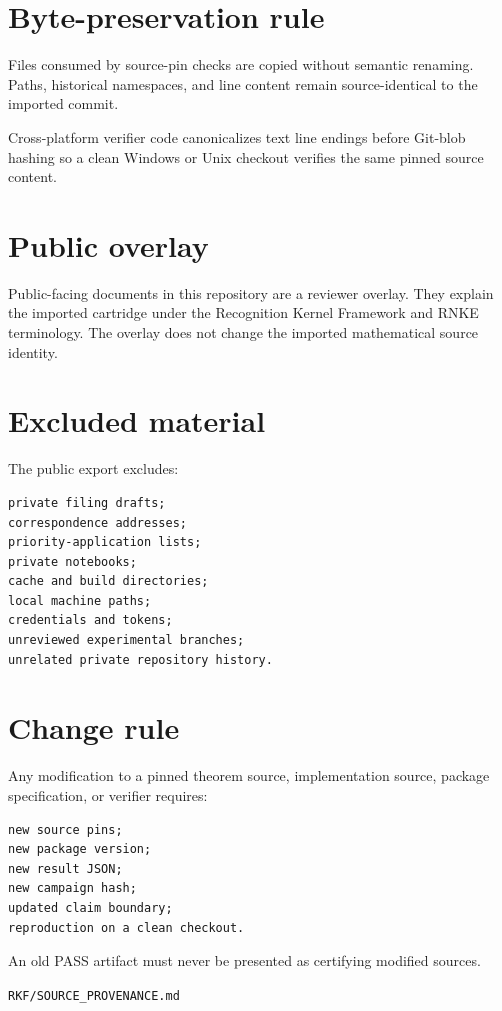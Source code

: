 \hypertarget{byte-preservation-rule}{%
\section{Byte-preservation rule}\label{byte-preservation-rule}}

Files consumed by source-pin checks are copied without semantic renaming. Paths, historical namespaces, and line content remain source-identical to the imported commit.

Cross-platform verifier code canonicalizes text line endings before Git-blob hashing so a clean Windows or Unix checkout verifies the same pinned source content.

\hypertarget{public-overlay}{%
\section{Public overlay}\label{public-overlay}}

Public-facing documents in this repository are a reviewer overlay. They explain the imported cartridge under the Recognition Kernel Framework and RNKE terminology. The overlay does not change the imported mathematical source identity.

\hypertarget{excluded-material}{%
\section{Excluded material}\label{excluded-material}}

The public export excludes:

\begin{verbatim}
private filing drafts;
correspondence addresses;
priority-application lists;
private notebooks;
cache and build directories;
local machine paths;
credentials and tokens;
unreviewed experimental branches;
unrelated private repository history.
\end{verbatim}

\hypertarget{change-rule}{%
\section{Change rule}\label{change-rule}}

Any modification to a pinned theorem source, implementation source, package specification, or verifier requires:

\begin{verbatim}
new source pins;
new package version;
new result JSON;
new campaign hash;
updated claim boundary;
reproduction on a clean checkout.
\end{verbatim}

An old PASS artifact must never be presented as certifying modified sources.

\begin{flushright}\small\texttt{RKF/SOURCE\_PROVENANCE.md}\end{flushright}
